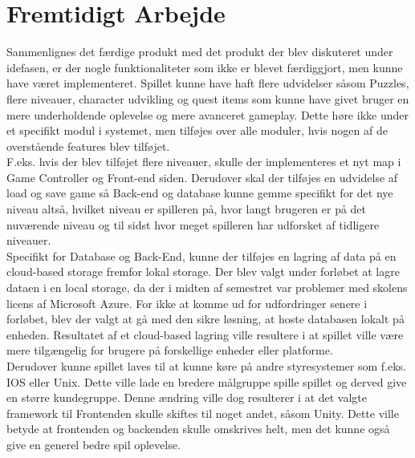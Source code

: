 \section{Fremtidigt Arbejde}
Sammenlignes det færdige produkt med det produkt der blev diskuteret under idefasen, er der nogle funktionaliteter som ikke er blevet færdiggjort, men kunne have været implementeret. Spillet kunne have haft flere udvidelser såsom Puzzles, flere niveauer, character udvikling og quest items som kunne have givet bruger en mere underholdende oplevelse og mere avanceret gameplay. Dette høre ikke under et specifikt modul i systemet, men tilføjes over alle moduler, hvis nogen af de overstående features blev tilføjet. \\

F.eks. hvis der blev tilføjet flere niveauer, skulle der implementeres et nyt map i Game Controller og Front-end siden. Derudover skal der tilføjes en udvidelse af load og save game så Back-end og database kunne gemme specifikt for det nye niveau altså, hvilket niveau er spilleren på, hvor langt brugeren er på det nuværende niveau og til sidst hvor meget spilleren har udforsket af tidligere niveauer.\\

Specifikt for Database og Back-End, kunne der tilføjes en lagring af data på en cloud-based storage fremfor lokal storage. Der blev valgt under forløbet at lagre dataen i en local storage, da der i midten af semestret var problemer med skolens licens af Microsoft Azure. For ikke at komme ud for udfordringer senere i forløbet, blev der valgt at gå med den sikre løsning, at hoste databasen lokalt på enheden. Resultatet af et cloud-based lagring ville resultere i at spillet ville være mere tilgængelig for brugere på forskellige enheder eller platforme. \\

Derudover kunne spillet laves til at kunne køre på andre styresystemer som f.eks. IOS eller Unix. Dette ville lade en bredere målgruppe spille spillet og derved give en større kundegruppe. Denne ændring ville dog resulterer i at det valgte framework til Frontenden skulle skiftes til noget andet, såsom Unity. Dette ville betyde at frontenden og backenden skulle omskrives helt, men det kunne også give en generel bedre spil oplevelse.


